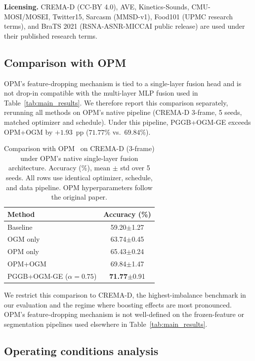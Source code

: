 \documentclass{article} %
\begin{document}
\noindent\textbf{Licensing.} CREMA-D (CC-BY 4.0), AVE, Kinetics-Sounds, CMU-MOSI/MOSEI, Twitter15, Sarcasm (MMSD-v1), Food101 (UPMC research terms), and BraTS 2021 (RSNA-ASNR-MICCAI public release) are used under their published research terms.

\subsection{Comparison with OPM}
\label{app:opm_comparison}

OPM's feature-dropping mechanism is tied to a single-layer fusion head and is not drop-in compatible with the multi-layer MLP fusion used in Table~\ref{tab:main_results}. We therefore report this comparison separately, rerunning all methods on OPM's native pipeline (CREMA-D 3-frame, 5 seeds, matched optimizer and schedule). Under this pipeline, PGGB+OGM-GE exceeds OPM+OGM by $+1.93$~pp ($71.77\%$ vs.\ $69.84\%$).

\begin{table}[H]
\centering
\caption{Comparison with OPM~\citep{wei2024opm} on CREMA-D (3-frame) under OPM's native single-layer fusion architecture. Accuracy (\%), mean $\pm$ std over 5 seeds. All rows use identical optimizer, schedule, and data pipeline. OPM hyperparameters follow the original paper.}
\label{tab:opm}
\vspace{0.5em}
\begin{tabular}{lc}
\toprule
\textbf{Method} & \textbf{Accuracy (\%)} \\
\midrule
Baseline               & 59.20{\scriptsize$\pm$1.27} \\
OGM only               & 63.74{\scriptsize$\pm$0.45} \\
OPM only               & 65.43{\scriptsize$\pm$0.24} \\
OPM+OGM                & 69.84{\scriptsize$\pm$1.47} \\
PGGB+OGM-GE ($\alpha{=}0.75$) & \textbf{71.77}{\scriptsize$\pm$0.91} \\
\bottomrule
\end{tabular}
\end{table}

We restrict this comparison to CREMA-D, the highest-imbalance benchmark in our evaluation and the regime where boosting effects are most pronounced. OPM's feature-dropping mechanism is not well-defined on the frozen-feature or segmentation pipelines used elsewhere in Table~\ref{tab:main_results}.

\subsection{Operating conditions analysis}
\label{app:opcond}
\end{document}
